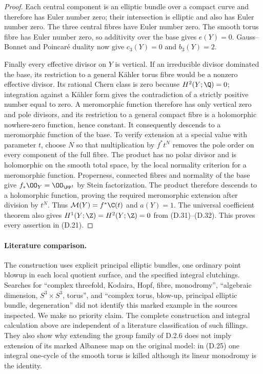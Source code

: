 \begin{proof}
Each central component is an elliptic bundle over a
compact curve and therefore has Euler number zero; their
intersection is elliptic and also has Euler number zero.
The three central fibres have Euler number zero. The
smooth torus fibre has Euler number zero, so additivity
over the base gives $e(Y)=0$. Gauss--Bonnet and Poincar\'e
duality now give $c_3(Y)=0$ and $b_3(Y)=2$.

Finally every effective divisor on $Y$ is vertical. If an
irreducible divisor dominated the base, its restriction
to a general K\"ahler torus fibre would be a nonzero
effective divisor. Its rational Chern class is zero
because $H^2(Y;\Q)=0$; integration against a K\"ahler
form gives the contradiction of a strictly positive
number equal to zero. A meromorphic function therefore
has only vertical zero and pole divisors, and its
restriction to a general compact fibre is a holomorphic
nowhere-zero function, hence constant. It consequently
descends to a meromorphic function of the base. To verify
extension at a special value with parameter $t$, choose
$N$ so that multiplication by $f^*t^N$ removes the pole
order on every component of the full fibre. The product
has no polar divisor and is holomorphic on the smooth
total space, by the local normality criterion for a
meromorphic function. Properness, connected fibres and
normality of the base give $f_*\OO_Y=\OO_{\PP^1}$ by
Stein factorization. The product therefore descends to a
holomorphic function, proving the required meromorphic
extension after division by $t^N$. Thus
$\mathcal M(Y)=f^*\C(t)$ and $a(Y)=1$.
The universal coefficient theorem also gives
$H^1(Y;\Z)=H^2(Y;\Z)=0$ from (D.31)--(D.32).
This proves every assertion in (D.21).
\end{proof}

\paragraph{Literature comparison.}
The construction uses explicit principal elliptic bundles,
one ordinary point blowup in each local quotient surface,
and the specified integral clutchings. Searches for
``complex threefold, Kodaira, Hopf, fibre, monodromy'',
``algebraic dimension, $S^3\times S^3$, torus'', and
``complex torus, blow-up, principal elliptic bundle,
degeneration'' did not identify this marked example in
the sources inspected. We make no priority claim.
The complete construction and integral calculation above
are independent of a literature classification of such
fillings. They also show why extending the group family
of D.2.6 does not imply extension of its marked Albanese
map on the original model: in (D.25) one integral
one-cycle of the smooth torus is killed although its
linear monodromy is the identity.



